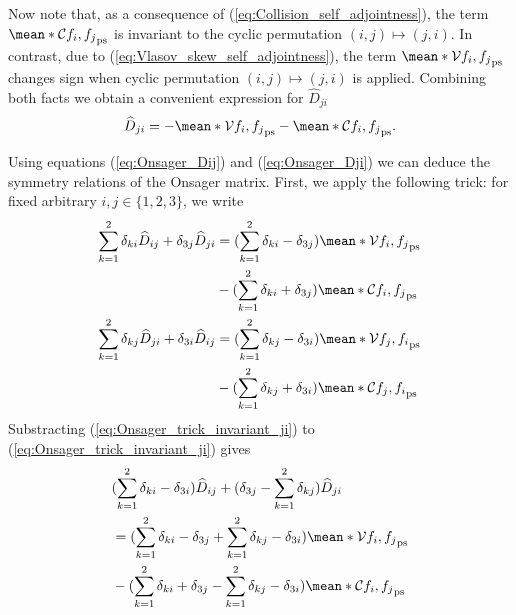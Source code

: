 Now note that, as a consequence of (\ref{eq:Collision_self_adjointness}), the term $\mean*{\mathcal{C} f_i, f_j}_{\text{ps}}$ is invariant to the cyclic permutation $(i,j)\mapsto (j,i)$. In contrast, due to (\ref{eq:Vlasov_skew_self_adjointness}), the term $\mean*{\mathcal{V} f_i, f_j}_{\text{ps}}$ changes sign when cyclic permutation $(i,j)\mapsto (j,i)$ is applied. Combining both facts we obtain a convenient expression for $\widehat{D}_{ji}$
%
\begin{align}
	\widehat{D}_{ji} = -\mean*{\mathcal{V} f_i, f_j}_{\text{ps}} - \mean*{\mathcal{C} f_i, f_j}_{\text{ps}}.
	\label{eq:Onsager_Dji}
\end{align}

Using equations (\ref{eq:Onsager_Dij}) and (\ref{eq:Onsager_Dji}) we can deduce the symmetry relations of the Onsager matrix. First, we apply the following trick: for fixed arbitrary $i,j\in\{1,2,3\}$, we write
%
\begin{align}
	\sum_{k=1}^{2}\delta_{ki}\widehat{D}_{ij}   + \delta_{3j}\widehat{D}_{ji} \nonumber
	& = 
	(\sum_{k=1}^{2}\delta_{ki} - \delta_{3j}) \mean*{\mathcal{V} f_i, f_j}_{\text{ps}}
	\nonumber
	\\
	& -
	(\sum_{k=1}^{2}\delta_{ki} + \delta_{3j}) \mean*{\mathcal{C} f_i, f_j}_{\text{ps}}
	\label{eq:Onsager_trick_invariant_ij}
	\\
	\sum_{k=1}^{2}\delta_{kj}\widehat{D}_{ji}   + \delta_{3i}\widehat{D}_{ij} \nonumber
	& = 
	(\sum_{k=1}^{2}\delta_{kj} - \delta_{3i}) \mean*{\mathcal{V} f_j, f_i}_{\text{ps}}
	\nonumber
	\\
	& -
	(\sum_{k=1}^{2}\delta_{kj} + \delta_{3i}) \mean*{\mathcal{C} f_j, f_i}_{\text{ps}}
	\label{eq:Onsager_trick_invariant_ji}
\end{align}
Substracting (\ref{eq:Onsager_trick_invariant_ji}) to (\ref{eq:Onsager_trick_invariant_ji}) gives
%
\begin{align}
	& (\sum_{k=1}^{2}\delta_{ki}- \delta_{3i})\widehat{D}_{ij}    
	+ 
	(\delta_{3j}
	-
	\sum_{k=1}^{2}\delta_{kj})\widehat{D}_{ji}\nonumber
	\\
	& = 
	(\sum_{k=1}^{2}\delta_{ki} - \delta_{3j} + \sum_{k=1}^{2}\delta_{kj} - \delta_{3i}) \mean*{\mathcal{V} f_i, f_j}_{\text{ps}}
	\nonumber 
	\\ 
	& -
	(\sum_{k=1}^{2}\delta_{ki} + \delta_{3j} - \sum_{k=1}^{2}\delta_{kj} - \delta_{3i}) \mean*{\mathcal{C} f_i, f_j}_{\text{ps}}
\end{align}



